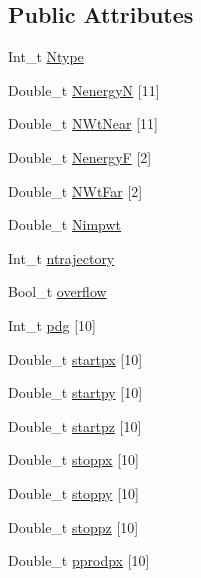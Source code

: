 \subsection*{Public Attributes}
\begin{DoxyCompactItemize}
\item 
Int\-\_\-t \hyperlink{classnu__g4numi_ab5167a93f34490c99c127d6f5292efb0}{Ntype}
\item 
Double\-\_\-t \hyperlink{classnu__g4numi_a36acd180b72c4686f55974e6783778ad}{Nenergy\-N} \mbox{[}11\mbox{]}
\item 
Double\-\_\-t \hyperlink{classnu__g4numi_a87ebc26325bb08a63d21171db959101a}{N\-Wt\-Near} \mbox{[}11\mbox{]}
\item 
Double\-\_\-t \hyperlink{classnu__g4numi_a47a88316abc9d5c30ba0c98893a441a8}{Nenergy\-F} \mbox{[}2\mbox{]}
\item 
Double\-\_\-t \hyperlink{classnu__g4numi_ab097def1361df4a718707a7e757bb2ae}{N\-Wt\-Far} \mbox{[}2\mbox{]}
\item 
Double\-\_\-t \hyperlink{classnu__g4numi_ae9ebb4d9a2b72dd69f17143ce6e41da0}{Nimpwt}
\item 
Int\-\_\-t \hyperlink{classnu__g4numi_abdbe76af4b20f3b5b5b2fb4b92156b42}{ntrajectory}
\item 
Bool\-\_\-t \hyperlink{classnu__g4numi_ad584f37592af684c65205de115a9aa85}{overflow}
\item 
Int\-\_\-t \hyperlink{classnu__g4numi_a4ed6688aee6debd26637a0401e5ef475}{pdg} \mbox{[}10\mbox{]}
\item 
Double\-\_\-t \hyperlink{classnu__g4numi_a309ea4b88683c5978593c0d474b1a976}{startpx} \mbox{[}10\mbox{]}
\item 
Double\-\_\-t \hyperlink{classnu__g4numi_a5247e8e73a100a7064f032806f542d38}{startpy} \mbox{[}10\mbox{]}
\item 
Double\-\_\-t \hyperlink{classnu__g4numi_a6bec79e4a2effa3cdaa28a1f02ae8124}{startpz} \mbox{[}10\mbox{]}
\item 
Double\-\_\-t \hyperlink{classnu__g4numi_a54b6004629ee3afa4f5e06b258def720}{stoppx} \mbox{[}10\mbox{]}
\item 
Double\-\_\-t \hyperlink{classnu__g4numi_a74c6c24c0fcad6777bedb8ba6a0e3787}{stoppy} \mbox{[}10\mbox{]}
\item 
Double\-\_\-t \hyperlink{classnu__g4numi_a64a1fb6d3798714d21c1135b76014d3a}{stoppz} \mbox{[}10\mbox{]}
\item 
Double\-\_\-t \hyperlink{classnu__g4numi_a11ce125811f5f35337733e18f3753d31}{pprodpx} \mbox{[}10\mbox{]}
\item 

\end{DoxyCompactItemize}
